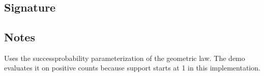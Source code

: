 \documentclass[letterpaper,10pt,english]{sphinxmanual}
\begin{document}
\section{}
\label{\detokenize{object_api_reference:geometric}}

\subsection{Signature}
\label{\detokenize{object_api_reference:id10}}
\begin{sphinxVerbatim}[commandchars=\\\{\}]

\end{sphinxVerbatim}


\subsection{Notes}
\label{\detokenize{object_api_reference:id11}}
\sphinxAtStartPar
Uses the success\sphinxhyphen{}probability parameterization of the geometric law. The demo evaluates it on positive counts because support starts at 1 in this implementation.
\end{document}
